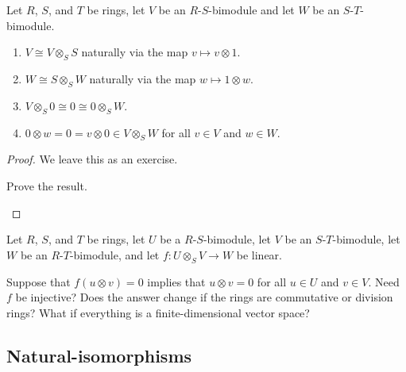 \begin{prp}{}{}
	Let $R$, $S$, and $T$ be rings, let $V$ be an $R$-$S$-bimodule and let $W$ be an $S$-$T$-bimodule.
	\begin{enumerate}
		\item $V\cong V\otimes _SS$ naturally via the map $v\mapsto v\otimes 1$.
		\item $W\cong S\otimes _SW$ naturally via the map $w\mapsto 1\otimes w$.
		\item $V\otimes _S0\cong 0\cong 0\otimes _SW$.
		\item $0\otimes w=0=v\otimes 0\in V\otimes _SW$ for all $v\in V$ and $w\in W$.
	\end{enumerate}
	\begin{proof}
		We leave this as an exercise.
		\begin{exr}[breakable=false]{}{}
			Prove the result.
		\end{exr}
	\end{proof}
\end{prp}

\begin{exr}{}{}
	Let $R$, $S$, and $T$ be rings, let $U$ be a $R$-$S$-bimodule, let $V$ be an $S$-$T$-bimodule, let $W$ be an $R$-$T$-bimodule, and let $f\colon U\otimes _SV\rightarrow W$ be linear.
	
	Suppose that $f(u\otimes v)=0$ implies that $u\otimes v=0$ for all $u\in U$ and $v\in V$.  Need $f$ be injective?  Does the answer change if the rings are commutative or division rings?  What if everything is a finite-dimensional vector space?
\end{exr}

\subsection{Natural-isomorphisms}

